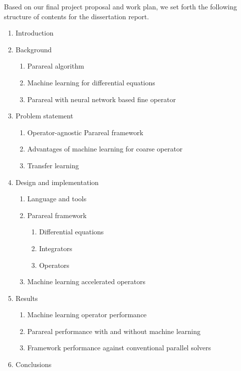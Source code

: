 \documentclass{article}
\begin{document}
Based on our final project proposal and work plan, we set forth the following structure of contents for the dissertation report.

\begin{enumerate}
	\item Introduction
	\item Background
    	\begin{enumerate}
    		\item Parareal algorithm
    		\item Machine learning for differential equations
    		\item Parareal with neural network based fine operator
    	\end{enumerate}
	\item Problem statement
    	\begin{enumerate}
    		\item Operator-agnostic Parareal framework
    		\item Advantages of machine learning for coarse operator
    		\item Transfer learning
    	\end{enumerate}
	\item Design and implementation
    	\begin{enumerate}
    	    \item Language and tools
    		\item Parareal framework
            	\begin{enumerate}
            		\item Differential equations
            		\item Integrators
            		\item Operators
            	\end{enumerate}
    		\item Machine learning accelerated operators
    	\end{enumerate}
    \item Results
        \begin{enumerate}
    		\item Machine learning operator performance
    		\item Parareal performance with and without machine learning
    		\item Framework performance against conventional parallel solvers
    	\end{enumerate}
	\item Conclusions
\end{enumerate}
\end{document}
